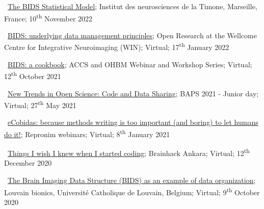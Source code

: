\textbullet~\href{https://osf.io/jpfrh}
{The BIDS Statistical Model};
Institut des neurosciences de la Timone, Marseille, France;
10\textsuperscript{th} November 2022

\textbullet~\href{https://osf.io/h6gsr/}{BIDS: underlying data management principles};
Open Research at the Wellcome Centre for Integrative Neuroimaging (WIN);
Virtual;
17\textsuperscript{th} January 2022

\textbullet~\href{https://remi-gau.github.io/bids_cookbook/}{BIDS: a cookbook};
ACCS and OHBM Webinar and Workshop Series;
Virtual;
12\textsuperscript{th} October 2021

\textbullet~\href{https://osf.io/6kzn2/}{New Trends in Open Science: Code and Data Sharing};
BAPS 2021 - Junior day;
Virtual;
27\textsuperscript{th} May 2021

\textbullet~\href{https://osf.io/fb7tx/}{eCobidas: because methods writing is too important (and boring) to let humans do it!};
Repronim webinars;
Virtual;
8\textsuperscript{th} January 2021

\textbullet~\href{https://osf.io/vdgua/}{Things I wish I knew when I started coding};
Brainhack Ankara;
Virtual;
12\textsuperscript{th} December 2020

\textbullet~\href{https://osf.io/zf5x8/}{The Brain Imaging Data Structure (BIDS) as an example of data organization};
Louvain bionics, Université Catholique de Louvain, Belgium;
Virtual;
9\textsuperscript{th} October 2020
